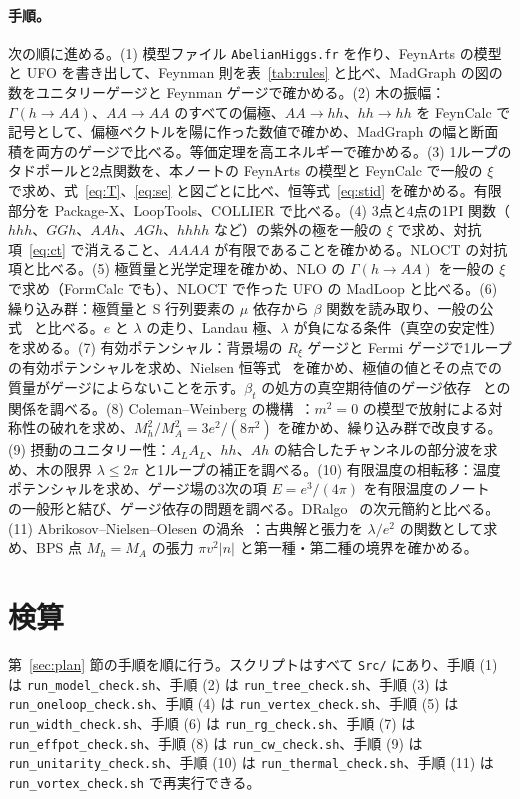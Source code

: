 \documentclass[a4paper,10pt]{ltjsarticle}
\begin{document}
\paragraph{手順。}次の順に進める。(1) 模型ファイル \texttt{AbelianHiggs.fr} を作り、FeynArts の模型と UFO を書き出して、Feynman 則を表~\ref{tab:rules} と比べ、MadGraph の図の数をユニタリーゲージと Feynman ゲージで確かめる。(2) 木の振幅：$\Gamma(h\to AA)$、$AA\to AA$ のすべての偏極、$AA\to hh$、$hh\to hh$ を FeynCalc で記号として、偏極ベクトルを陽に作った数値で確かめ、MadGraph の幅と断面積を両方のゲージで比べる。等価定理を高エネルギーで確かめる。(3) 1ループのタドポールと2点関数を、本ノートの FeynArts の模型と FeynCalc で一般の $\xi$ で求め、式~\eqref{eq:T}、\eqref{eq:se} と図ごとに比べ、恒等式~\eqref{eq:stid} を確かめる。有限部分を Package-X、LoopTools、COLLIER で比べる。(4) 3点と4点の1PI 関数（$hhh$、$GGh$、$AAh$、$AGh$、$hhhh$ など）の紫外の極を一般の $\xi$ で求め、対抗項~\eqref{eq:ct} で消えること、$AAAA$ が有限であることを確かめる。NLOCT の対抗項と比べる。(5) 極質量と光学定理を確かめ、NLO の $\Gamma(h\to AA)$ を一般の $\xi$ で求め（FormCalc でも）、NLOCT で作った UFO の MadLoop と比べる。(6) 繰り込み群：極質量と S 行列要素の $\mu$ 依存から $\beta$ 関数を読み取り、一般の公式~\cite{mv1,mv3} と比べる。$e$ と $\lambda$ の走り、Landau 極、$\lambda$ が負になる条件（真空の安定性）を求める。(7) 有効ポテンシャル：背景場の $R_\xi$ ゲージと Fermi ゲージで1ループの有効ポテンシャルを求め、Nielsen 恒等式~\cite{nielsen75} を確かめ、極値の値とその点での質量がゲージによらないことを示す。$\beta_t$ の処方の真空期待値のゲージ依存~\cite{ssv13} との関係を調べる。(8) Coleman--Weinberg の機構~\cite{cw73}：$m^2=0$ の模型で放射による対称性の破れを求め、$M_h^2/M_A^2=3e^2/(8\pi^2)$ を確かめ、繰り込み群で改良する。(9) 摂動のユニタリー性：$A_LA_L$、$hh$、$Ah$ の結合したチャンネルの部分波を求め、木の限界 $\lambda\le2\pi$ と1ループの補正を調べる。(10) 有限温度の相転移：温度ポテンシャルを求め、ゲージ場の3次の項 $E=e^3/(4\pi)$ を有限温度のノート~\cite{thermalnote} の一般形と結び、ゲージ依存の問題を調べる。DRalgo~\cite{dralgo} の次元簡約と比べる。(11) Abrikosov--Nielsen--Olesen の渦糸~\cite{abrikosov57,no73}：古典解と張力を $\lambda/e^2$ の関数として求め、BPS 点 $M_h=M_A$ の張力 $\pi v^2|n|$ と第一種・第二種の境界を確かめる。

\section{検算}\label{sec:checks}

第~\ref{sec:plan} 節の手順を順に行う。スクリプトはすべて \texttt{Src/} にあり、手順 (1) は \texttt{run\_model\_check.sh}、手順 (2) は \texttt{run\_tree\_check.sh}、手順 (3) は \texttt{run\_oneloop\_check.sh}、手順 (4) は \texttt{run\_vertex\_check.sh}、手順 (5) は \texttt{run\_width\_check.sh}、手順 (6) は \texttt{run\_rg\_check.sh}、手順 (7) は \texttt{run\_effpot\_check.sh}、手順 (8) は \texttt{run\_cw\_check.sh}、手順 (9) は \texttt{run\_unitarity\_check.sh}、手順 (10) は \texttt{run\_thermal\_check.sh}、手順 (11) は \texttt{run\_vortex\_check.sh} で再実行できる。
\end{document}
